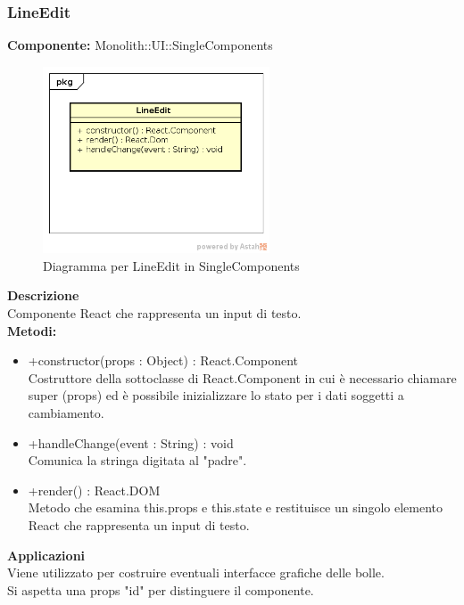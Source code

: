\clearpage

\subsubsection{LineEdit}
\textbf{Componente:}  Monolith::UI::SingleComponents\\
   \FloatBarrier
   \begin{figure}[ht]
   \centering
   \includegraphics[width=0.6\textwidth]{img/single-LineEdit}
   \caption{{Diagramma per LineEdit in SingleComponents}}
\end{figure}
\FloatBarrier
\textbf{Descrizione}\\
Componente React che rappresenta un input di testo. \\
\textbf{Metodi:} 
\begin{itemize}
\item +constructor(props : Object) : React.Component 
\\
Costruttore della sottoclasse di React.Component in cui è necessario chiamare super (props) ed è possibile inizializzare lo stato per i dati soggetti a cambiamento.
\item +handleChange(event : String) : void  
\\
Comunica la stringa digitata al "padre". 
\item +render() : React.DOM 
\\
Metodo che esamina this.props e this.state e restituisce un singolo elemento React che rappresenta un input di testo.
\end{itemize} 


\textbf{Applicazioni}\\
Viene utilizzato per costruire eventuali interfacce grafiche delle bolle. \\
Si aspetta una props "id" per distinguere il componente. 


\clearpage

